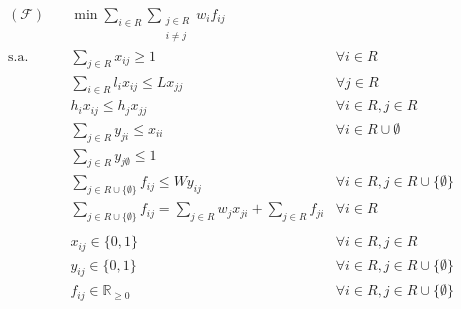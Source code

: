 \documentclass{article}
\begin{document}
\begin{align}
    (\mathcal{F})\quad
        &\min \sum_{i \in R} \sum_{\substack{j \in R\\i \neq j}} w_i f_{ij}\nonumber\\
    \text{s.a.}\quad
        &\sum_{j \in R} x_{ij} \geq 1                               & \forall i \in R\\
        &\sum_{i \in R} l_{i} x_{ij} \leq L x_{jj}                  & \forall j \in R\\
        &h_i x_{ij} \leq h_j x_{jj}                                 & \forall i \in R, j \in R\\
        &\sum_{j \in R} y_{ji} \leq x_{ii} & \forall i \in R \cup \emptyset\\
        &\sum_{j \in R} y_{j\emptyset} \leq 1\\
        &\sum_{j \in R \cup \{\emptyset\}} f_{ij} \leq W y_{ij} & \forall i \in R, j \in R \cup \{\emptyset\}\\
        &\sum_{j \in R \cup \{\emptyset\}} f_{ij} = \sum_{j \in R} w_j x_{ji} + \sum_{j \in R} f_{ji} & \forall i \in R\\
        \nonumber\\
        &x_{ij} \in \{0, 1\}                                        & \forall i \in R, j \in R\nonumber\\
        &y_{ij} \in \{0, 1\}                                        & \forall i \in R, j \in R \cup \{\emptyset\}\nonumber\\
        &f_{ij} \in \mathbb{R}_{\geq 0}                             & \forall i \in R, j \in R \cup \{\emptyset\}\nonumber\\
\end{align}
\end{document}
